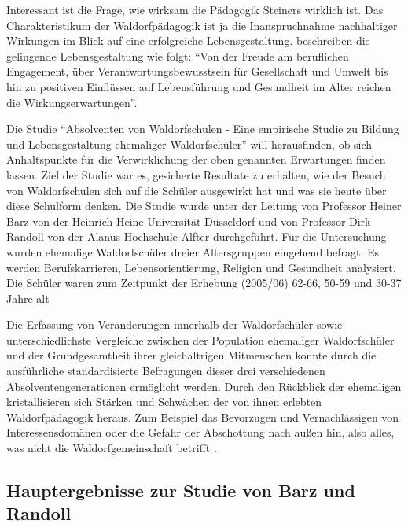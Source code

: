 Interessant ist die Frage, wie wirksam die Pädagogik Steiners wirklich ist. Das Charakteristikum der Waldorfpädagogik ist ja die Inanspruchnahme nachhaltiger Wirkungen im Blick auf eine erfolgreiche Lebensgestaltung. \citet[][S. 13]{randoll07} beschreiben die gelingende Lebensgestaltung wie folgt: \enquote{Von der Freude am beruflichen Engagement, über Verantwortungsbewusstsein für Gesellschaft und Umwelt bis hin zu positiven Einflüssen auf Lebensführung und Gesundheit im Alter reichen die Wirkungserwartungen}.

Die Studie \enquote{Absolventen von Waldorfschulen - Eine empirische Studie zu Bildung und Lebensgestaltung ehemaliger Waldorfschüler} will herausfinden, ob sich Anhaltspunkte für die Verwirklichung der oben genannten Erwartungen finden lassen.
Ziel der Studie war es, gesicherte Resultate zu erhalten, wie der Besuch von Waldorfschulen sich auf die Schüler ausgewirkt hat und was sie heute über diese Schulform denken.
Die Studie wurde unter der Leitung von Professor Heiner Barz von der Heinrich Heine Universität Düsseldorf und von Professor Dirk Randoll von der Alanus Hochschule Alfter durchgeführt. 
Für die Untersuchung wurden ehemalige Waldorfschüler dreier Altersgruppen eingehend befragt. 
Es werden Berufskarrieren, Lebensorientierung, Religion und Gesundheit analysiert. 
Die Schüler waren zum Zeitpunkt der Erhebung (2005/06) 62-66, 50-59 und 30-37 Jahre alt \citep[vgl.][]{randoll07, paschen10}


Die Erfassung von Veränderungen innerhalb der Waldorfschüler sowie unterschiedlichste Vergleiche zwischen der Population ehemaliger Waldorfschüler und der Grundgesamtheit ihrer gleichaltrigen Mitmenschen konnte durch die ausführliche standardisierte Befragungen dieser drei verschiedenen Absolventengenerationen ermöglicht werden. Durch den Rückblick der ehemaligen kristallisieren sich Stärken und Schwächen der von ihnen erlebten Waldorfpädagogik heraus. Zum Beispiel das Bevorzugen und Vernachlässigen von Interessensdomänen oder die Gefahr der Abschottung nach außen hin, also alles, was nicht die Waldorfgemeinschaft betrifft \citep[vgl.][S. 12]{randoll07}.

\subsection{Hauptergebnisse zur Studie von Barz und Randoll} %
\label{sub:hauptergebnisse}

